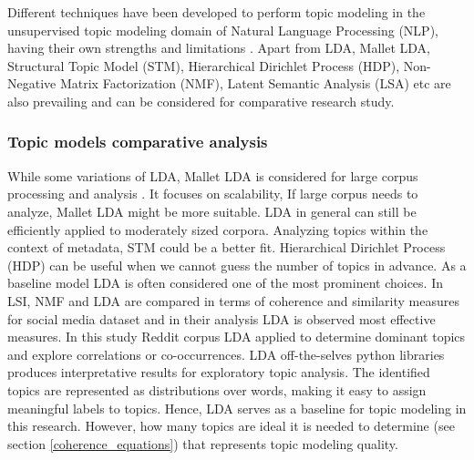 \documentclass[sn-mathphys,Numbered]{sn-jnl}%
\theoremstyle{thmstyleone}%
\theoremstyle{thmstyletwo}%
\theoremstyle{thmstylethree}%
\begin{document}
Different techniques have been developed to perform topic modeling in the unsupervised topic modeling domain of Natural Language Processing (NLP), having their own strengths and limitations \cite{vayansky2020review, abdelrazek2022topic, yi2009comparative}. Apart from LDA, Mallet LDA, Structural Topic Model (STM), Hierarchical Dirichlet Process (HDP), Non-Negative Matrix Factorization (NMF), Latent Semantic Analysis (LSA) etc are also prevailing and can be considered for comparative research study.

\subsubsection{Topic models comparative analysis}
While some variations of LDA, Mallet LDA is considered for large corpus processing and analysis \cite{vayansky2020review, abdelrazek2022topic, Comparison_Topic_Modeling_Algorithms}. It focuses on scalability, If large corpus needs to analyze, Mallet LDA might be more suitable. LDA in general can still be efficiently applied to moderately sized corpora. Analyzing topics within the context of metadata, STM could be a better fit. Hierarchical Dirichlet Process (HDP) can be useful when we cannot guess the number of topics in advance. As a baseline model LDA is often considered one of the most prominent choices. In \cite{Comparison_Topic_Modeling_Algorithms} LSI, NMF and LDA are compared in terms of coherence and similarity measures for social media dataset and in their analysis LDA is observed most effective measures. In this study Reddit corpus LDA applied to determine dominant topics and explore correlations or co-occurrences. LDA off-the-selves python libraries produces interpretative results for exploratory topic analysis. The identified topics are represented as distributions over words, making it easy to assign meaningful labels to topics. Hence, LDA serves as a baseline for topic modeling in this research. However, how many topics are ideal it is needed to determine (see section \ref{coherence_equations}) that represents topic modeling quality.
\end{document}
